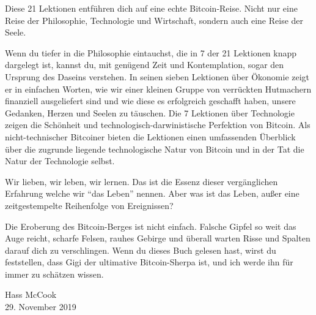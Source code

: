 Diese 21 Lektionen entführen dich auf eine echte Bitcoin-Reise. Nicht nur eine
Reise der Philosophie, Technologie und Wirtschaft, sondern auch eine Reise der
Seele.

Wenn du tiefer in die Philosophie eintauchst, die in 7 der 21 Lektionen knapp
dargelegt ist, kannst du, mit genügend Zeit und Kontemplation, sogar den
Ursprung des Daseins verstehen. In seinen sieben Lektionen über Ökonomie zeigt
er in einfachen Worten, wie wir einer kleinen Gruppe von verrückten Hutmachern
finanziell ausgeliefert sind und wie diese es erfolgreich geschafft haben,
unsere Gedanken, Herzen und Seelen zu täuschen. Die 7 Lektionen über Technologie
zeigen die Schönheit und technologisch-darwinistische Perfektion von Bitcoin.
Als nicht-technischer Bitcoiner bieten die Lektionen einen umfassenden Überblick
über die zugrunde liegende technologische Natur von Bitcoin und in der Tat die
Natur der Technologie selbst.

Wir lieben, wir leben, wir lernen. Das ist die Essenz dieser vergänglichen
Erfahrung welche wir \enquote{das Leben} nennen. Aber was ist das Leben, außer
eine zeitgestempelte Reihenfolge von Ereignissen?

Die Eroberung des Bitcoin-Berges ist nicht einfach. Falsche Gipfel so weit das
Auge reicht, scharfe Felsen, rauhes Gebirge und überall warten Risse und Spalten
darauf dich zu verschlingen. Wenn du dieses Buch gelesen hast, wirst du
feststellen, dass Gigi der ultimative Bitcoin-Sherpa ist, und ich werde ihn für
immer zu schätzen wissen.

\begin{flushright}
  Hass McCook \\
  29. November 2019
\end{flushright}
